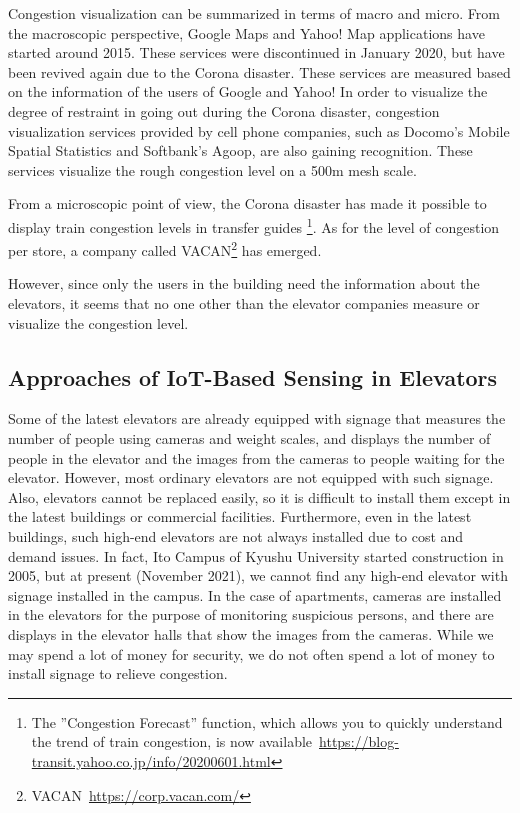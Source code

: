 Congestion visualization can be summarized in terms of macro and micro. From the macroscopic perspective, Google Maps and Yahoo! Map applications have started around 2015. These services were discontinued in January 2020, but have been revived again due to the Corona disaster. These services are measured based on the information of the users of Google and Yahoo! In order to visualize the degree of restraint in going out during the Corona disaster, congestion visualization services provided by cell phone companies, such as Docomo's Mobile Spatial Statistics and Softbank's Agoop, are also gaining recognition. These services visualize the rough congestion level on a 500m mesh scale.

From a microscopic point of view, the Corona disaster has made it possible to display train congestion levels in transfer guides \footnote{The ''Congestion Forecast'' function, which allows you to quickly understand the trend of train congestion, is now available~\url{https://blog-transit.yahoo.co.jp/info/20200601.html}}. As for the level of congestion per store, a company called VACAN\footnote{VACAN~\url{https://corp.vacan.com/}} has emerged. 

However, since only the users in the building need the information about the elevators, it seems that no one other than the elevator companies measure or visualize the congestion level.


\subsection{Approaches of IoT-Based Sensing in Elevators}

Some of the latest elevators are already equipped with signage that measures the number of people using cameras and weight scales, and displays the number of people in the elevator and the images from the cameras to people waiting for the elevator. However, most ordinary elevators are not equipped with such signage. Also, elevators cannot be replaced easily, so it is difficult to install them except in the latest buildings or commercial facilities. Furthermore, even in the latest buildings, such high-end elevators are not always installed due to cost and demand issues. In fact, Ito Campus of Kyushu University started construction in 2005, but at present (November 2021), we cannot find any high-end elevator with signage installed in the campus. In the case of apartments, cameras are installed in the elevators for the purpose of monitoring suspicious persons, and there are displays in the elevator halls that show the images from the cameras. While we may spend a lot of money for security, we do not often spend a lot of money to install signage to relieve congestion.


